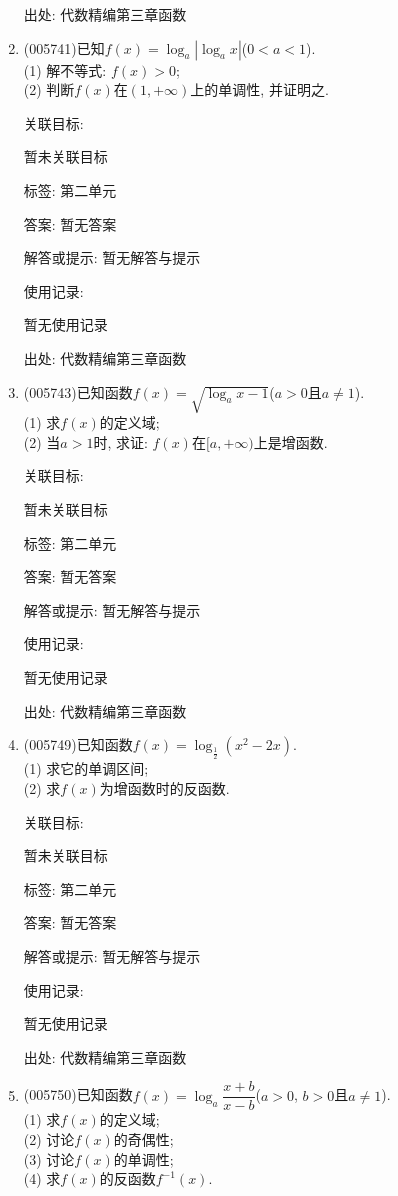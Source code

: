 \documentclass[10pt,a4paper]{article}
\begin{document}
\begin{enumerate}[1.]
出处: 代数精编第三章函数
\item { (005741)}已知$f(x)=\log_a|\log_ax|$($0<a<1$).\\
(1) 解不等式: $f(x)>0$;\\
(2) 判断$f(x)$在$(1,+\infty)$上的单调性, 并证明之.


关联目标:

暂未关联目标



标签: 第二单元

答案: 暂无答案

解答或提示: 暂无解答与提示

使用记录:

暂无使用记录


出处: 代数精编第三章函数
\item { (005743)}已知函数$f(x)=\sqrt {\log_ax-1}$($a>0$且$a\ne 1$).\\
(1) 求$f(x)$的定义域;\\
(2) 当$a>1$时, 求证: $f(x)$在$[a,+\infty)$上是增函数.


关联目标:

暂未关联目标



标签: 第二单元

答案: 暂无答案

解答或提示: 暂无解答与提示

使用记录:

暂无使用记录


出处: 代数精编第三章函数
\item { (005749)}已知函数$f(x)=\log_{\frac 12}(x^2-2x)$.\\
(1) 求它的单调区间;\\
(2) 求$f(x)$为增函数时的反函数.


关联目标:

暂未关联目标



标签: 第二单元

答案: 暂无答案

解答或提示: 暂无解答与提示

使用记录:

暂无使用记录


出处: 代数精编第三章函数
\item { (005750)}已知函数$f(x)=\log_a\dfrac{x+b}{x-b}$($a>0$, $b>0$且$a\ne 1$).\\
(1) 求$f(x)$的定义域;\\
(2) 讨论$f(x)$的奇偶性;\\
(3) 讨论$f(x)$的单调性;\\
(4) 求$f(x)$的反函数$f^{-1}(x)$.



\end{enumerate}
\end{document}
